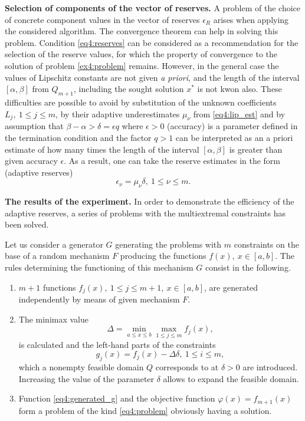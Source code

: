 \textbf{Selection of components of the vector of reserves.} A problem of the choice of concrete component values in the vector of reserves $\epsilon_R$ arises when applying the considered algorithm.
The convergence theorem can help in solving this problem. Condition \eqref{eq4:reserves} can be considered as a recommendation for the selection of the reserve values, for which the property of
convergence to the solution of problem \eqref{ex4:problem} remains. However, in the general case the values of Lipschitz constants are not given \emph{a priori}, and the length of the interval $[\alpha,\beta]$ from $Q_{m + 1}$, including the sought solution $x^*$ is not kwon also. These difficulties are possible to avoid by
substitution of the unknown coefficients $L_j,\: 1\le j\le m$, by their adaptive underestimates $\mu_\nu$ from \eqref{eq4:lip_est} and by assumption that $\beta-\alpha>\delta=\epsilon q$ where $\epsilon >0$ (accuracy) is a parameter defined in the termination condition and the factor $q>1$ can be interpreted as an a priori estimate of how many times the length of the interval $[\alpha,\beta]$ is greater than given accuracy $\epsilon$. As a result, one can take
the reserve estimates in the form (adaptive reserves)
\begin{displaymath}
  \epsilon_\nu=\mu_\nu\delta,\: 1\le\nu\le m.
\end{displaymath}

\textbf{The results of the experiment.} In order to demonstrate the efficiency of the adaptive reserves, a series of problems with the multiextremal constraints has been solved.

Let us consider a generator $G$ generating the problems with $m$ constraints on the base of a random mechanism $F$ producing the functions $f(x),\: x \in [ a , b ]$. The rules determining the
functioning of this mechanism $G$ consist in the following.
\begin{enumerate}
  \item $m+1$ functions $f_j(x),\: 1\le j \le m+1,\: x\in[a,b]$, are generated independently by means of given mechanism $F$.
  \item The minimax value
  \begin{displaymath}
    \Delta=\min_{a\le x\le b}\max_{1\le j\le m}f_j(x),
  \end{displaymath}
  is calculated and the left-hand parts of the constraints
  \begin{equation}
    \label{eq4:generated_g}
    g_j(x)=f_j(x)-\Delta\delta,\: 1\le i\le m,
  \end{equation}
  which a nonempty feasible domain $Q$ corresponds to at $\delta>0$ are introduced. Increasing the value of the parameter $\delta$ allows to expand the feasible domain.
  \item Function \eqref{eq4:generated_g} and the objective function $\varphi(x)=f_{m+1}( x )$ form a problem of the kind \eqref{eq4:problem} obviously having a solution.
\end{enumerate}

